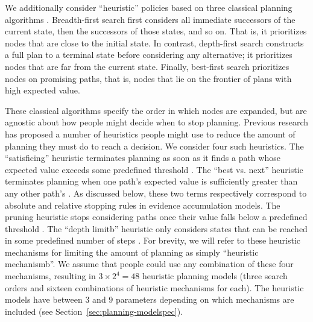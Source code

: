 We additionally consider ``heuristic'' policies based on three classical planning algorithms \citep{russell2002artificial}. Breadth-first search first considers all immediate successors of the current state, then the successors of those states, and so on. That is, it prioritizes nodes that are close to the initial state. In contrast, depth-first search constructs a full plan to a terminal state before considering any alternative; it prioritizes nodes that are far from the current state. Finally, best-first search prioritizes nodes on promising paths, that is, nodes that lie on the frontier of plans with high expected value.

These classical algorithms specify the order in which nodes are expanded, but are agnostic about how people might decide when to stop planning. Previous research has proposed a number of heuristics people might use to reduce the amount of planning they must do to reach a decision. We consider four such heuristics. The ``satisficing'' heuristic terminates planning as soon as it finds a path whose expected value exceeds some predefined threshold \citep{simon1955behavioral}. The ``best vs. next'' heuristic terminates planning when one path's expected value is sufficiently greater than any other path's \citep{solway2015evidence}. As discussed below, these two terms respectively correspond to absolute and relative stopping rules in evidence accumulation models. The pruning heuristic stops considering paths once their value falls below a predefined threshold \citep{huys2012bonsai}. The ``depth limitb'' heuristic only considers states that can be reached in some predefined number of steps \citep{macgregor2001information,keramati2016adaptive,krusche2018adaptive,snider2015prospective}. For brevity, we will refer to these heuristic mechanisms for limiting the amount of planning as simply ``heuristic mechanismb''. We assume that people could use any combination of these four mechanisms, resulting in $3 \times 2^4 = 48$ heuristic planning models (three search orders and sixteen combinations of heuristic mechanisms for each). The heuristic models have between $3$ and $9$ parameters depending on which mechanisms are included (see Section~\ref{sec:planning-modelspec}).

